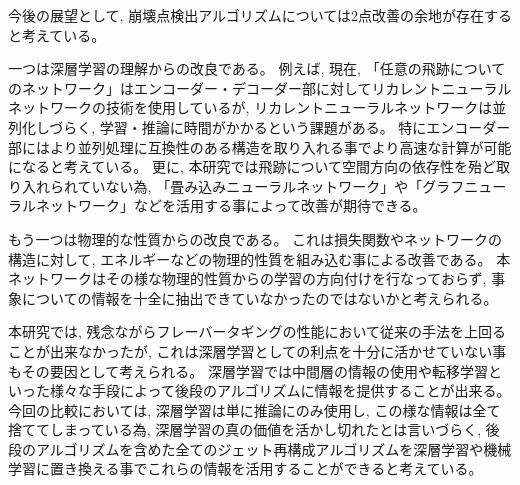 今後の展望として, 崩壊点検出アルゴリズムについては$2$点改善の余地が存在すると考えている。

一つは深層学習の理解からの改良である。
例えば, 現在, 「任意の飛跡についてのネットワーク」はエンコーダー・デコーダー部に対してリカレントニューラルネットワークの技術を使用しているが, リカレントニューラルネットワークは並列化しづらく, 学習・推論に時間がかかるという課題がある。
特にエンコーダー部にはより並列処理に互換性のある構造を取り入れる事でより高速な計算が可能になると考えている。
更に, 本研究では飛跡について空間方向の依存性を殆ど取り入れられていない為, 「畳み込みニューラルネットワーク」や「グラフニューラルネットワーク」などを活用する事によって改善が期待できる。

もう一つは物理的な性質からの改良である。
これは損失関数やネットワークの構造に対して, エネルギーなどの物理的性質を組み込む事による改善である。
本ネットワークはその様な物理的性質からの学習の方向付けを行なっておらず, 事象についての情報を十全に抽出できていなかったのではないかと考えられる。

本研究では, 残念ながらフレーバータギングの性能において従来の手法を上回ることが出来なかったが, これは深層学習としての利点を十分に活かせていない事もその要因として考えられる。
深層学習では中間層の情報の使用や転移学習といった様々な手段によって後段のアルゴリズムに情報を提供することが出来る。
今回の比較においては, 深層学習は単に推論にのみ使用し, この様な情報は全て捨ててしまっている為, 深層学習の真の価値を活かし切れたとは言いづらく, 後段のアルゴリズムを含めた全てのジェット再構成アルゴリズムを深層学習や機械学習に置き換える事でこれらの情報を活用することができると考えている。

















